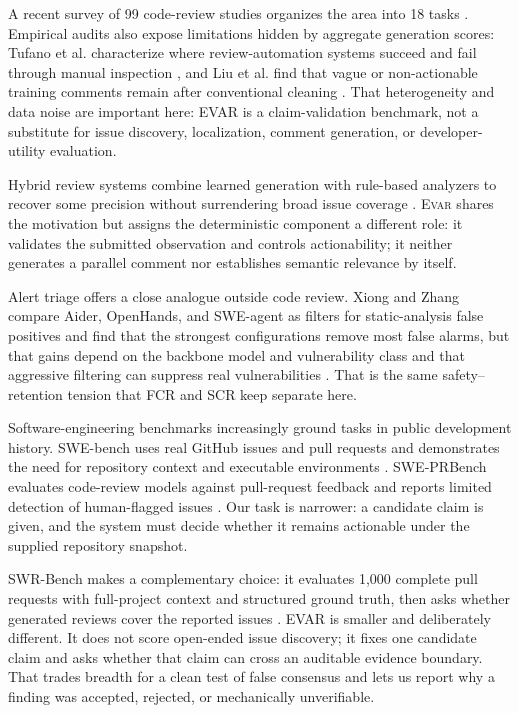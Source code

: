 \documentclass[acmsmall,screen,review,anonymous]{acmart}
\newcommand{\evar}{\textsc{Evar}\xspace}
\begin{document}
A recent survey of 99 code-review studies organizes the area into 18 tasks \cite{review-survey}. Empirical audits also expose limitations hidden by aggregate generation scores: Tufano et al. characterize where review-automation systems succeed and fail through manual inspection \cite{tufano-strengths}, and Liu et al. find that vague or non-actionable training comments remain after conventional cleaning \cite{too-noisy}. That heterogeneity and data noise are important here: EVAR is a claim-validation benchmark, not a substitute for issue discovery, localization, comment generation, or developer-utility evaluation.

Hybrid review systems combine learned generation with rule-based analyzers to recover some precision without surrendering broad issue coverage \cite{hybrid-static}. \evar shares the motivation but assigns the deterministic component a different role: it validates the submitted observation and controls actionability; it neither generates a parallel comment nor establishes semantic relevance by itself.

Alert triage offers a close analogue outside code review. Xiong and Zhang compare Aider, OpenHands, and SWE-agent as filters for static-analysis false positives and find that the strongest configurations remove most false alarms, but that gains depend on the backbone model and vulnerability class and that aggressive filtering can suppress real vulnerabilities \cite{sifting-noise}. That is the same safety--retention tension that FCR and SCR keep separate here.

Software-engineering benchmarks increasingly ground tasks in public development history. SWE-bench uses real GitHub issues and pull requests and demonstrates the need for repository context and executable environments \cite{swebench}. SWE-PRBench evaluates code-review models against pull-request feedback and reports limited detection of human-flagged issues \cite{sweprbench}. Our task is narrower: a candidate claim is given, and the system must decide whether it remains actionable under the supplied repository snapshot.

SWR-Bench makes a complementary choice: it evaluates 1,000 complete pull requests with full-project context and structured ground truth, then asks whether generated reviews cover the reported issues \cite{swrbench}. EVAR is smaller and deliberately different. It does not score open-ended issue discovery; it fixes one candidate claim and asks whether that claim can cross an auditable evidence boundary. That trades breadth for a clean test of false consensus and lets us report why a finding was accepted, rejected, or mechanically unverifiable.
\end{document}
